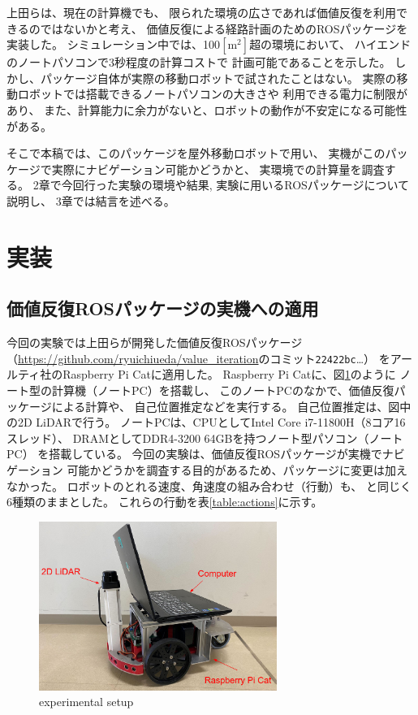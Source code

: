 \documentclass{jarticle}
\begin{document}
上田らは、現在の計算機でも、
限られた環境の広さであれば価値反復を利用できるのではないかと考え、
価値反復による経路計画のためのROSパッケージを実装した\cite{上田rsj2021}。
シミュレーション中では、100$\mathrm{[m^2]}$超の環境において、
ハイエンドのノートパソコンで3秒程度の計算コストで
計画可能であることを示した。
しかし、パッケージ自体が実際の移動ロボットで試されたことはない。
実際の移動ロボットでは搭載できるノートパソコンの大きさや
利用できる電力に制限があり、
また、計算能力に余力がないと、ロボットの動作が不安定になる可能性がある。


そこで本稿では、このパッケージを屋外移動ロボットで用い、
実機がこのパッケージで実際にナビゲーション可能かどうかと、
実環境での計算量を調査する。
2章で今回行った実験の環境や結果, 実験に用いるROSパッケージについて説明し、
3章では結言を述べる。

\section{実装}%

\subsection{価値反復ROSパッケージの実機への適用}

今回の実験では上田らが開発した価値反復ROSパッケージ
（\url{https://github.com/ryuichiueda/value_iteration}のコミット\texttt{22422bc}\dots）
\cite{上田rsj2021}をアールティ社のRaspberry Pi Catに適用した。
Raspberry Pi Catに、図\ref{fig:raspicat}のように
ノート型の計算機（ノートPC）を搭載し、
このノートPCのなかで、価値反復パッケージによる計算や、
自己位置推定などを実行する。
自己位置推定は、図中の2D LiDARで行う。
ノートPCは、CPUとしてIntel Core i7-11800H（8コア16スレッド）、
DRAMとしてDDR4-3200 64GBを持つノート型パソコン（ノートPC）
を搭載している。
今回の実験は、価値反復ROSパッケージが実機でナビゲーション
可能かどうかを調査する目的があるため、パッケージに変更は加えなかった。
ロボットのとれる速度、角速度の組み合わせ（行動）も、
\cite{上田rsj2021}と同じく6種類のままとした。
これらの行動を表\ref{table:actions}に示す。

\begin{figure}[htb]
  \centering
   \includegraphics[height=55mm]{./figs/raspicat.png}
   \caption{experimental setup}
	\label{fig:raspicat}
\end{figure}
\end{document}
